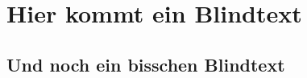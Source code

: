 \documentclass{scrartcl}
\begin{document}
\section{Hier kommt ein Blindtext}
\blindtext[2]

\blindtext[3]

\subsection{Und noch ein bisschen Blindtext}
\blindtext[2]

\blindtext[5]

\blindtext[2]
\end{document}
